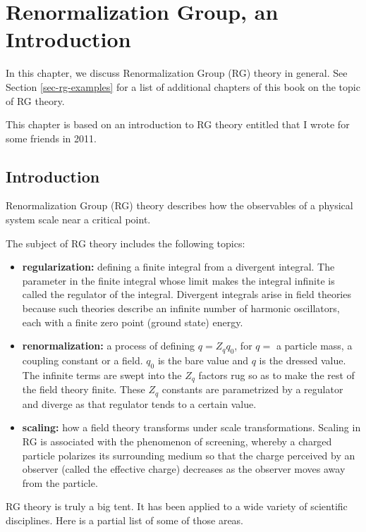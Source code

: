 \chapter{Renormalization Group, an Introduction}
\label{ch-renorm-group-intro}

In this chapter, we discuss
Renormalization Group (RG)
theory in general.
See Section \ref{sec-rg-examples} for a list of additional chapters of this book 
on the topic of RG theory.

This chapter is based on 
an introduction to RG theory 
entitled  that I wrote for some friends in 2011.

\section{Introduction}
 Renormalization Group (RG)
theory
 describes how the observables of
a physical system scale
near a critical point.

The subject of RG theory
includes the following topics:
\begin{itemize}
\item {\bf regularization:}
defining a finite integral
from a  divergent integral.
The parameter in the finite integral
whose  limit makes the
integral infinite is called the
regulator of the integral.
Divergent integrals arise 
in field theories because such
theories describe an infinite number
of harmonic oscillators, each with
a finite zero point (ground state)  energy.
\item {\bf renormalization:}
a process of defining $q =Z_q q_0$,
for $q=$ a particle mass, a coupling constant
or a field.
$q_0$ is the bare value and $q$ is the dressed value.
The infinite terms 
are swept into the $Z_q$
factors rug
so as to make the rest of the
field theory finite. These $Z_q$
constants
are parametrized by a
regulator and diverge as
that regulator tends to a
certain value.
\item {\bf scaling:} how a field theory transforms
under scale transformations.
Scaling in RG
is associated with
 the phenomenon of screening,
whereby a charged particle polarizes
its surrounding medium so that
the charge perceived by
an observer (called
the effective charge)
decreases as
the observer moves
away from the particle.



\end{itemize}



RG theory is
truly a big tent.
It has been applied to
a wide variety of scientific disciplines.
Here is a partial list of some of
those areas. 

